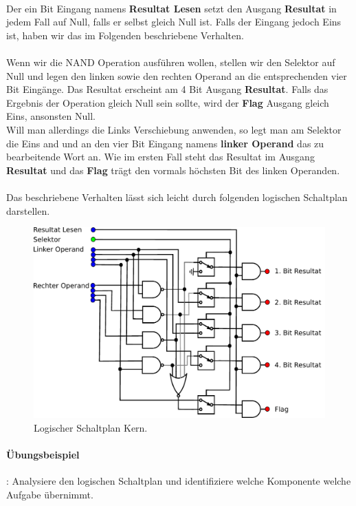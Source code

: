 \documentclass[11pt,a4paper,leqno]{report}
\numberwithin{equation}{chapter}
\begin{document}
\\
Der ein Bit Eingang namens \textbf{Resultat Lesen} setzt den Ausgang \textbf{Resultat} in jedem Fall auf Null, falls er selbst gleich Null ist. Falls der Eingang jedoch Eins ist, haben wir das im Folgenden beschriebene Verhalten.\\
\\
Wenn wir die NAND Operation ausf\"uhren wollen, stellen wir den Selektor auf Null und legen den linken sowie den rechten Operand an die entsprechenden vier Bit Eing\"ange. Das Resultat erscheint am 4 Bit Ausgang \textbf{Resultat}.
Falls das Ergebnis der Operation gleich Null sein sollte, wird der \textbf{Flag} Ausgang gleich Eins, ansonsten Null.\\
Will man allerdings die Links Verschiebung anwenden, so legt man am Selektor die Eins and und an den vier Bit Eingang namens \textbf{linker Operand} das zu bearbeitende Wort an. Wie im ersten Fall steht das Resultat im Ausgang \textbf{Resultat} und das \textbf{Flag} tr\"agt den vormals h\"ochsten Bit des linken Operanden.\\
\\
Das beschriebene Verhalten l\"asst sich leicht durch folgenden logischen Schaltplan darstellen.
\begin{figure}[H]
	\begin{center}
		\includegraphics[scale=0.6]{Bilder/Kern.pdf}
		\caption{Logischer Schaltplan Kern.}
	\end{center}
\end{figure}
\noindent
\paragraph{\"Ubungsbeispiel}: Analysiere den logischen Schaltplan und identifiziere welche Komponente welche Aufgabe \"ubernimmt.
\newpage
\end{document}
